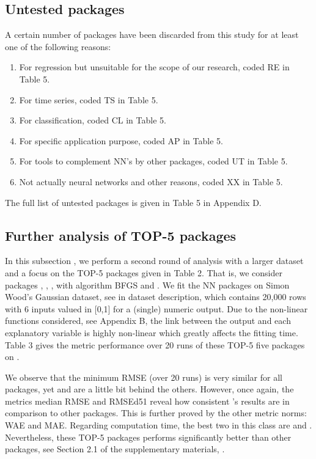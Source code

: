 \hypertarget{untested-packages}{%
\subsection{Untested packages}\label{untested-packages}}

A certain number of packages have been discarded from this study for at
least one of the following reasons:

\begin{enumerate}
\def\labelenumi{\arabic{enumi}.}
\tightlist
\item
  For regression but unsuitable for the scope of our research, coded RE
  in Table 5.
\item
  For time series, coded TS in Table 5.
\item
  For classification, coded CL in Table 5.
\item
  For specific application purpose, coded AP in Table 5.
\item
  For tools to complement NN's by other packages, coded UT in Table 5.
\item
  Not actually neural networks and other reasons, coded XX in Table 5.
\end{enumerate}

The full list of untested packages is given in Table 5 in Appendix D.

\hypertarget{further-analysis-of-top-5-packages}{%
\subsection{Further analysis of TOP-5
packages}\label{further-analysis-of-top-5-packages}}

In this subsection , we perform a second round of analysis with a larger
dataset and a focus on the TOP-5 packages given in Table 2. That is, we
consider packages , , , 
with algorithm BFGS and . We fit the NN packages on
Simon Wood's Gaussian dataset, see  in dataset
description, which contains 20,000 rows with 6 inputs valued in
{[}0,1{]} for a (single) numeric output. Due to the non-linear functions
considered, see Appendix B, the link between the output and each
explanatory variable is highly non-linear which greatly affects the
fitting time. Table 3 gives the metric performance over 20 runs of these
TOP-5 five packages on .

We observe that the minimum RMSE (over 20 runs) is very similar for all
packages, yet  and  are a little bit behind
the others. However, once again, the metrics median RMSE and RMSEd51
reveal how consistent 's results are in comparison to other
packages. This is further proved by the other metric norms: WAE and MAE.
Regarding computation time, the best two in this class are 
and . Nevertheless, these TOP-5 packages performs
significantly better than other packages, see Section 2.1 of the
supplementary materials, \citep{suppl:material:paper}.

